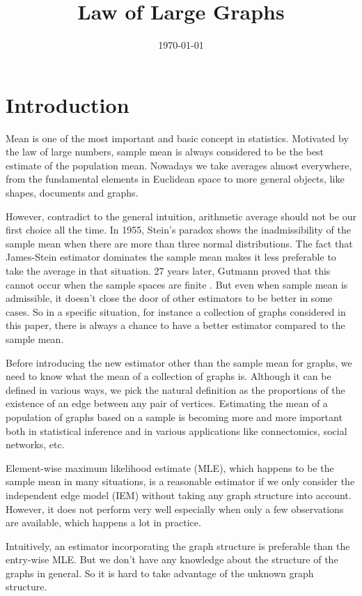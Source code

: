 \documentclass[a4paper]{article}
\title{Law of Large Graphs}
\date{\today}
\begin{document}
\maketitle

\section{Introduction}

Mean is one of the most important and basic concept in statistics. Motivated by the law of large numbers, sample mean is always considered to be the best estimate of the population mean. Nowadays we take averages almost everywhere, from the fundamental elements in Euclidean space to more general objects, like shapes, documents and graphs.

However, contradict to the general intuition, arithmetic average should not be our first choice all the time. In 1955, Stein's paradox \cite{efron1977stein} shows the inadmissibility of the sample mean when there are more than three normal distributions. The fact that James-Stein estimator dominates the sample mean makes it less preferable to take the average in that situation. 27 years later, Gutmann proved that this cannot occur when the sample spaces are finite \cite{gutmann1982stein}. But even when sample mean is admissible, it doesn't close the door of other estimators to be better in some cases. So in a specific situation, for instance a collection of graphs considered in this paper, there is always a chance to have a better estimator compared to the sample mean.

Before introducing the new estimator other than the sample mean for graphs, we need to know what the mean of a collection of graphs is. Although it can be defined in various ways, we pick the natural definition as the proportions of the existence of an edge between any pair of vertices. Estimating the mean of a population of graphs based on a sample is becoming more and more important both in statistical inference and in various applications like connectomics, social networks, etc.

Element-wise maximum likelihood estimate (MLE), which happens to be the sample mean in many situations, is a reasonable estimator if we only consider the independent edge model (IEM) \cite{bollobas2007phase} without taking any graph structure into account. However, it does not perform very well especially when only a few observations are available, which happens a lot in practice.

Intuitively, an estimator incorporating the graph structure is preferable than the entry-wise MLE. But we don't have any knowledge about the structure of the graphs in general. So it is hard to take advantage of the unknown graph structure.
\end{document}
